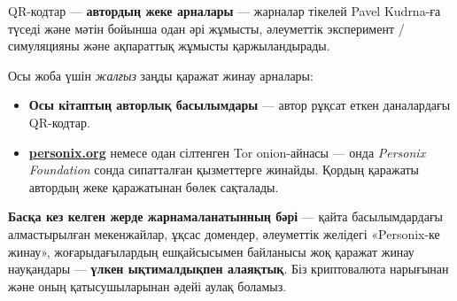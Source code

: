 \begin{minipage}[t]{0.60\textwidth}
\vspace{0pt}
\begin{mdframed}[
  linewidth=0.7pt,roundcorner=5pt,
  innerleftmargin=10pt,innerrightmargin=10pt,
  innertopmargin=8pt,innerbottommargin=8pt,
  skipabove=0pt,skipbelow=0pt,
  linecolor=cbwarning!50,backgroundcolor=cbwarning!5,
  nobreak=true,
  needspace=4\baselineskip,
]
\footnotesize
QR-кодтар --- \textbf{автордың жеке арналары} --- жарналар тікелей Pavel Kudrna-ға түседі және мәтін бойынша одан әрі жұмысты, әлеуметтік эксперимент / симуляцияны және ақпараттық жұмысты қаржыландырады.

\smallskip
Осы жоба үшін \emph{жалғыз} заңды қаражат жинау арналары:

\smallskip
\begin{itemize}
\setlength{\itemsep}{0pt}
\setlength{\topsep}{0pt}
\item \textbf{Осы кітаптың авторлық басылымдары} --- автор рұқсат еткен даналардағы QR-кодтар.
\item \href{https://personix.org}{\textbf{personix.org}} немесе одан сілтенген Tor onion-айнасы --- онда \emph{Personix Foundation} сонда сипатталған қызметтерге жинайды. Қордың қаражаты автордың жеке қаражатынан бөлек сақталады.
\end{itemize}

\smallskip
\textbf{Басқа кез келген жерде жарнамаланатынның бәрі} --- қайта басылымдардағы алмастырылған мекенжайлар, ұқсас домендер, әлеуметтік желідегі «Personix-ке жинау», жоғарыдағылардың ешқайсысымен байланысы жоқ қаражат жинау науқандары --- \textbf{үлкен ықтималдықпен алаяқтық}. Біз криптовалюта нарығынан және оның қатысушыларынан әдейі аулақ боламыз.
\end{mdframed}
\end{minipage}

\clearpage
